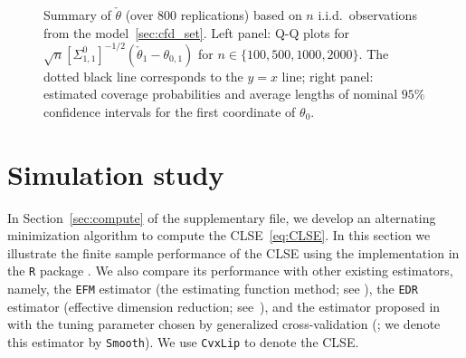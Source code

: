 {\begin{figure}[!h]
\begin{minipage}{0.50\linewidth}
\begin{tabular}{rcc}
\end{tabular}

    \par
\end{minipage}
\caption{Summary of $\check{\theta}$ (over  800 replications) based on $n$ i.i.d.~observations from the model~\ref{sec:cfd_set}. Left panel:  Q-Q plots for $\sqrt{n}\left[\Sigma^0_{1,1}\right]^{-1/2}(\check{\theta}_{1}-\theta_{0,1})$  for  $n\in \{100, 500,1000, 2000\}$. The dotted black line corresponds to the $y=x$ line; right panel: estimated coverage probabilities and average lengths of nominal $95\%$ confidence intervals for the first coordinate of $\theta_0$. }%
\label{fig:QQplot}
\end{figure}




\section{Simulation study}\label{sec:Simul_Cvx}
{In Section~\ref{sec:compute} of the supplementary file, we develop an alternating minimization algorithm to compute the CLSE~\eqref{eq:CLSE}. 
  In this section we illustrate the finite sample performance of the CLSE using the implementation in the \texttt{R} package  \fi  {}\blind{\texttt{***}}\fi}. We also compare its performance with other existing estimators, namely, the \texttt{EFM} estimator (the estimating function method; see \cite{cuietal11}), the \texttt{EDR} estimator (effective dimension reduction; see~\citet{Hristacheetal01}), and the estimator proposed in~\cite{Patra16} with the tuning parameter chosen by generalized cross-validation (\cite{Patra16}; we denote this estimator by \texttt{Smooth}).
We use \texttt{CvxLip} to denote the CLSE.


}
